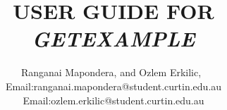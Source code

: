 \documentclass[journal,a4paper,pdftex]{IEEEtran}
\begin{document}
%
\title{USER GUIDE FOR \emph{GETEXAMPLE}}
%
%
%

\author{Ranganai Mapondera,
and Ozlem Erkilic,~
       \\Email:ranganai.mapondera@student.curtin.edu.au\\Email:ozlem.erkilic@student.curtin.edu.au}

% 
%
\end{document}
